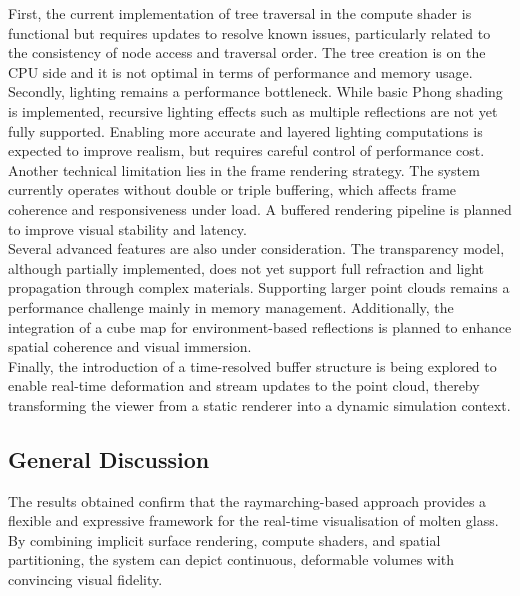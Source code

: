 \documentclass{rapportcs}
\begin{document}
        \noindent First, the current implementation of tree traversal in the compute shader is functional but requires updates to resolve known issues, particularly related to the consistency of node access and traversal order. The tree creation is on the CPU side and it is not optimal in terms of performance and memory usage.\\
        
        \noindent Secondly, lighting remains a performance bottleneck. While basic Phong shading is implemented, recursive lighting effects such as multiple reflections are not yet fully supported. Enabling more accurate and layered lighting computations is expected to improve realism, but requires careful control of performance cost.\\
        
        \noindent Another technical limitation lies in the frame rendering strategy. The system currently operates without double or triple buffering, which affects frame coherence and responsiveness under load. A buffered rendering pipeline is planned to improve visual stability and latency.\\
        
        \noindent Several advanced features are also under consideration. The transparency model, although partially implemented, does not yet support full refraction and light propagation through complex materials. Supporting larger point clouds remains a performance challenge mainly in memory management. Additionally, the integration of a cube map for environment-based reflections is planned to enhance spatial coherence and visual immersion.\\
        
        \noindent Finally, the introduction of a time-resolved buffer structure is being explored to enable real-time deformation and stream updates to the point cloud, thereby transforming the viewer from a static renderer into a dynamic simulation context.
    
    \newpage
    
    \subsection{General Discussion}
    
        The results obtained confirm that the raymarching-based approach provides a flexible and expressive framework for the real-time visualisation of molten glass. By combining implicit surface rendering, compute shaders, and spatial partitioning, the system can depict continuous, deformable volumes with convincing visual fidelity.\\
\end{document}
